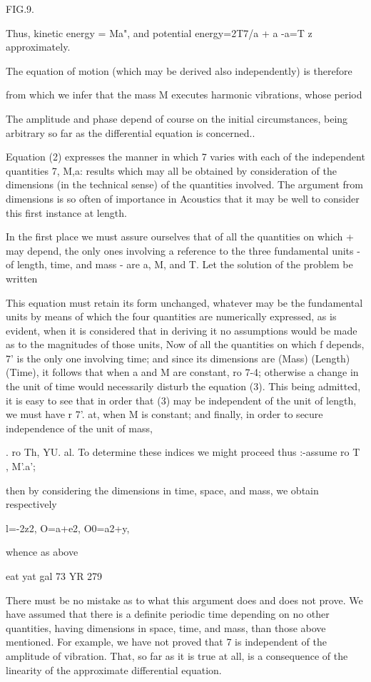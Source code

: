 FIG.9.

Thus, kinetic energy = Ma", and potential energy=2T7/a + a -a=T z
approximately.

The equation of motion (which may be derived also independently) is therefore

from which we infer that the mass M executes harmonic vibrations, whose period

The amplitude and phase depend of course on the initial circumstances, being
arbitrary so far as the differential equation is concerned..

Equation (2) expresses the manner in which 7 varies with each of the
independent quantities 7, M,a: results which may all be obtained by
consideration of the dimensions (in the technical sense) of the quantities
involved. The argument from dimensions is so often of importance in Acoustics
that it may be well to consider this first instance at length.

In the first place we must assure ourselves that of all the quantities on which
+ may depend, the only ones involving a reference to the three fundamental
units - of length, time, and mass - are a, M, and T. Let the solution of the
problem be written

This equation must retain its form unchanged, whatever may be the fundamental
units by means of which the four quantities are numerically expressed, as is
evident, when it is considered that in deriving it no assumptions would be made
as to the magnitudes of those units, Now of all the quantities on which f
depends, 7' is the only one involving time; and since its dimensions are (Mass)
(Length) (Time), it follows that when a and M are constant, ro 7-4; otherwise a
change in the unit of time would necessarily disturb the equation (3). This
being admitted, it is easy to see that in order that (3) may be independent of
the unit of length, we must have r 7'. at, when M is constant; and finally, in
order to secure independence of the unit of mass,

. ro Th, YU. al. To determine these indices we might proceed thus :-assume ro T
, M'.a';

then by considering the dimensions in time, space, and mass, we obtain
respectively

l=-2z2, O=a+e2, O0=a2+y,

whence as above

eat yat gal 73 YR 279

There must be no mistake as to what this argument does and does not prove. We
have assumed that there is a definite periodic time depending on no other
quantities, having dimensions in space, time, and mass, than those above
mentioned. For example, we have not proved that 7 is independent of the
amplitude of vibration. That, so far as it is true at all, is a consequence of
the linearity of the approximate differential equation.

